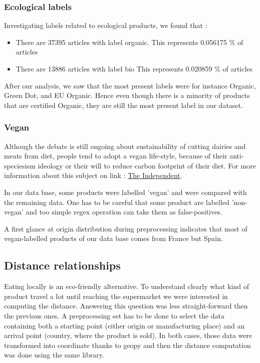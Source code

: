 \documentclass[11pt]{article}
\begin{document}
\subsubsection{Ecological labels}
Investigating labels related to ecological products, we found that : 
\begin{itemize}
    \item There are 37395 articles with label organic. This represents 0.056175 \% of articles 
    \item There are 13886 articles with label bio
This represents 0.020859 \% of articles 
\end{itemize}

After our analysis, we saw that the most present labels were for instance Organic, Green Dot, and EU Organic. Hence even though there is a minority of products that are certified Organic, they are still the most present label in our dataset.

\subsubsection{Vegan}



Although the debate is still ongoing about sustainability of cutting dairies and meats from diet, people tend to adopt a vegan life-style, because of their anti-
speciesism ideology or their will to reduce carbon footprint of their diet. For more information about this subject on link : \href{https://www.independent.co.uk/life-style/health-and-families/veganism-environmental-impact-planet-reduced-plant-based-diet-humans-study-a8378631.html}{The Independent}.

In our data base, some products were labelled 'vegan' and were compared with the remaining data. One has to be careful that some product are labelled 'non-vegan' and too simple regex operation can take them as false-positives.

A first glance at origin distribution during preprocessing indicates that most of vegan-labelled products of our data base comes from France but Spain.


\subsection{Distance relationships}
Eating locally is an eco-friendly alternative. To understand clearly what kind of product travel a lot until reaching the supermarket we were interested in computing the distance. Answering this question was less straight-forward then the previous ones. A preprocessing set has to be done to select the data containing both a starting point (either origin or manufacturing place) and an arrival point (country, where the product is sold). In both cases, those data were transformed into coordinate thanks to geopy and then the distance computation was done using the same library. 
\end{document}
